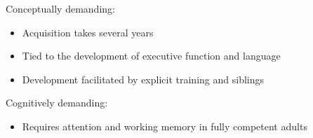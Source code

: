 \documentclass[11pt]{extarticle}
\begin{document}
\begin{multicols}{3}
Conceptually demanding:
\begin{itemize}\itemsep0pt
\item Acquisition takes several years\citep{Wimmer:1983dz,Wellman:2001lz}
\item Tied to the development of executive function\citep{Perner:1999yr,Sabbagh:2006ke} and language\citep{Astington2005ot}
\item Development facilitated by explicit training\citep{Slaughter:1996fv} and siblings\citep{Clements:2000nc,Hughes:2004zj}
\end{itemize}
%
Cognitively demanding: 
\begin{itemize}
\item Requires attention and working memory in fully competent adults\citep{Apperly:2008jv,McKinnon:2007rr}
\end{itemize}






\footnotesize 


\end{multicols}
\end{document}
